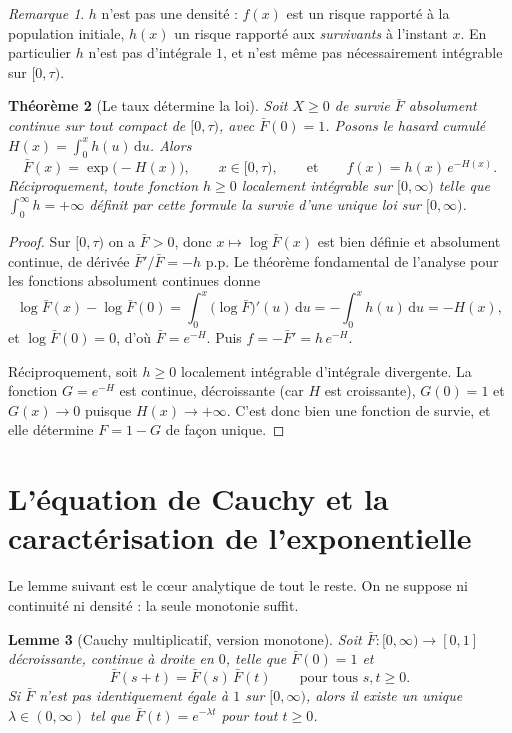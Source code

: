 \documentclass[11pt,a4paper]{article}
\theoremstyle{plain}
\newtheorem{theoreme}{Théorème}[section]
\newtheorem{lemme}[theoreme]{Lemme}
\theoremstyle{definition}
\theoremstyle{remark}
\newtheorem{remarque}[theoreme]{Remarque}
\newcommand{\barF}{\bar{F}}
\newcommand{\dd}{\,\mathrm{d}}
\begin{document}
\begin{remarque}
$h$ n'est pas une densité : $f(x)$ est un risque rapporté à la population
initiale, $h(x)$ un risque rapporté aux \emph{survivants} à l'instant $x$. En
particulier $h$ n'est pas d'intégrale $1$, et n'est même pas nécessairement
intégrable sur $[0,\tau)$.
\end{remarque}

\begin{theoreme}[Le taux détermine la loi]\label{th:reconstruction}
Soit $X\ge0$ de survie $\barF$ absolument continue sur tout compact de
$[0,\tau)$, avec $\barF(0)=1$. Posons le \emph{hasard cumulé}
$H(x)=\int_0^x h(u)\dd u$. Alors
\[
\barF(x)=\exp\bigl(-H(x)\bigr),\qquad x\in[0,\tau),
\qquad\text{et}\qquad f(x)=h(x)\,e^{-H(x)} .
\]
Réciproquement, toute fonction $h\ge0$ localement intégrable sur $[0,\infty)$
telle que $\int_0^\infty h=+\infty$ définit par cette formule la survie d'une
unique loi sur $[0,\infty)$.
\end{theoreme}

\begin{proof}
Sur $[0,\tau)$ on a $\barF>0$, donc $x\mapsto\log\barF(x)$ est bien définie et
absolument continue, de dérivée $\barF'/\barF=-h$ p.p. Le théorème fondamental
de l'analyse pour les fonctions absolument continues donne
\[
\log\barF(x)-\log\barF(0)=\int_0^x\bigl(\log\barF\bigr)'(u)\dd u=-\int_0^x h(u)\dd u=-H(x),
\]
et $\log\barF(0)=0$, d'où $\barF=e^{-H}$. Puis $f=-\barF'=h\,e^{-H}$.

Réciproquement, soit $h\ge0$ localement intégrable d'intégrale divergente. La
fonction $G=e^{-H}$ est continue, décroissante (car $H$ est croissante),
$G(0)=1$ et $G(x)\to0$ puisque $H(x)\to+\infty$. C'est donc bien une fonction de
survie, et elle détermine $F=1-G$ de façon unique.
\end{proof}

\section{L'équation de Cauchy et la caractérisation de l'exponentielle}

Le lemme suivant est le c\oe ur analytique de tout le reste. On ne suppose ni
continuité ni densité : la seule monotonie suffit.

\begin{lemme}[Cauchy multiplicatif, version monotone]\label{lem:cauchy}
Soit $\barF:[0,\infty)\to[0,1]$ décroissante, continue à droite en $0$, telle que
$\barF(0)=1$ et
\[
\barF(s+t)=\barF(s)\,\barF(t)\qquad\text{pour tous } s,t\ge0 .
\tag{$\star$}
\]
Si $\barF$ n'est pas identiquement égale à $1$ sur $[0,\infty)$, alors il existe
un unique $\lambda\in(0,\infty)$ tel que $\barF(t)=e^{-\lambda t}$ pour tout $t\ge0$.
\end{lemme}
\end{document}
